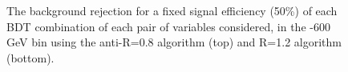 \begin{figure}
\begin{center}
\caption{The background rejection
for a fixed signal efficiency (50\%) of each BDT combination of
each pair of variables considered, in the -600 GeV bin using the anti-\kT R=0.8
algorithm (top) and R=1.2 algorithm (bottom).}
\label{fig:pt500_comb2D}
\end{center}
\end{figure}

